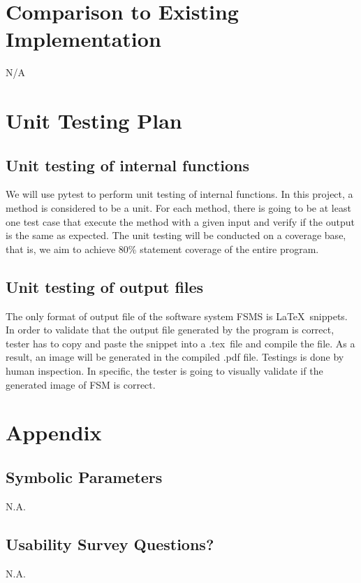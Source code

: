 \documentclass[12pt, titlepage]{article}
\begin{document}
\section{Comparison to Existing Implementation}	

N/A
				
\section{Unit Testing Plan}
		
\subsection{Unit testing of internal functions}
We will use pytest to perform unit testing of internal functions. In this
project, a method is considered to be a unit. For each method, there is going to
be at least one test case that execute the method with a given input and verify
if the output is the same as expected. The unit testing will be conducted on a
coverage base, that is, we aim to achieve 80\% statement coverage of the entire program.
\subsection{Unit testing of output files}		
The only format of output file of the software system FSMS is \LaTeX\ snippets.
In order to validate that the output file generated by the program is correct,
tester has to copy and paste the snippet into a .tex\ file and compile the file.
As a result, an image will be generated in the compiled .pdf file. Testings is
done by human inspection. In specific, the tester is going to visually validate
if the generated image of FSM is correct.  




\newpage

\section{Appendix}

\subsection{Symbolic Parameters}

N.A.
\subsection{Usability Survey Questions?}

N.A.
\end{document}
